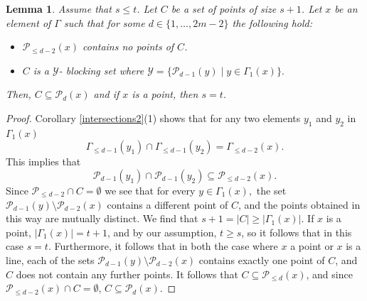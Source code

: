 \documentclass[12pt]{article}
\newcommand{\Points}{\mathcal{P}}
\newtheorem{lemma}{Lemma}
\theoremstyle{remark}
\begin{document}
\begin{lemma}\label{pointsAtDist} Assume that \(s\le t\). 
	Let \(C\) be a set of points of size \(s+1\). 
	Let \(x\) be an element of \(\Gamma\) such that for some \(d\in\{1,\dots,2m-2\}\) the following hold:
	\begin{itemize}
		\item \(\Points_{\le d-2}(x)\) contains no points of \(C\).
		\item $C$ is a $\mathcal{Y}$- blocking set where $\mathcal{Y}=\{\Points_{d-1}(y)\mid y\in \Gamma_1(x)\}.$
        
	\end{itemize}
	Then, \(C\subseteq \Points_d(x)\) and if \(x\) is a point, then \(s=t\).
\end{lemma}
\begin{proof}
Corollary \ref{intersections2}(1) shows that for any two elements \(y_1\) and \(y_2\) in \(\Gamma_{1}(x)\) \[ \Gamma_{\le d-1}(y_1)\cap\Gamma_{\le d-1}(y_2)=\Gamma_{\le d - 2}(x).\]
This implies that 
\[\Points_{d-1}(y_1)\cap\Points_{d-1}(y_2) \subseteq \Points_{\leq d-2}(x).\]
Since $\mathcal{P}_{\leq d-2}\cap C=\emptyset$ we see that for every $y\in \Gamma_1(x),$ the set \(\Points_{d-1}(y)\setminus\Points_{d-2}(x)\) contains a different point of \(C\), and the points obtained in this way are mutually distinct. We find that $s+1=|C|\geq |\Gamma_1(x)|$. If $x$ is a point, $|\Gamma_1(x)|=t+1$, and by our assumption, $t\geq s$, so it follows that in this case $s=t$.
Furthermore, it follows that in both the case where $x$ a point or $x$ is a line, each of the sets  \(\Points_{d-1}(y)\setminus\Points_{d-2}(x)\) contains exactly one point of \(C\), and $C$ does not contain any further points. It follows that $C\subseteq \Points_{\leq d}(x)$, and since $\Points_{\leq d-2}(x)\cap C=\emptyset$, $C\subseteq \Points_d(x)$.
\end{proof}
\end{document}
